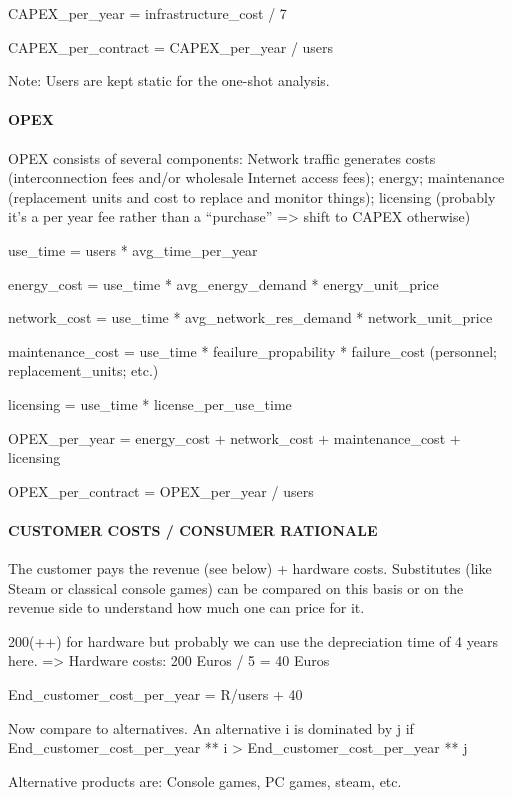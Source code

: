 CAPEX\_per\_year = infrastructure\_cost / 7

CAPEX\_per\_contract = CAPEX\_per\_year / users 

Note: Users are kept static for the one-shot analysis. 


\paragraph{OPEX}

OPEX consists of several components: Network traffic generates costs (interconnection fees and/or wholesale Internet access fees); energy; maintenance (replacement units and cost to replace and monitor things); licensing (probably it’s a per year fee rather than a “purchase” => shift to CAPEX otherwise)

use\_time = users * avg\_time\_per\_year

energy\_cost = use\_time * avg\_energy\_demand * energy\_unit\_price

network\_cost = use\_time * avg\_network\_res\_demand * network\_unit\_price

maintenance\_cost = use\_time * feailure\_propability * failure\_cost (personnel; replacement\_units; etc.)

licensing = use\_time * license\_per\_use\_time

OPEX\_per\_year = energy\_cost + network\_cost + maintenance\_cost + licensing

OPEX\_per\_contract = OPEX\_per\_year / users


\paragraph{CUSTOMER COSTS / CONSUMER RATIONALE}

The customer pays the revenue (see below) + hardware costs. Substitutes (like Steam or classical console games) can be compared on this basis or on the revenue side to understand how much one can price for it.

200(++) for hardware but probably we can use the depreciation time of 4 years here. 
=> Hardware costs: 200 Euros / 5 = 40 Euros


End\_customer\_cost\_per\_year = R/users + 40

Now compare to alternatives. An alternative i is dominated by j if End\_customer\_cost\_per\_year ** i > End\_customer\_cost\_per\_year ** j

Alternative products are: Console games, PC games, steam, etc.

